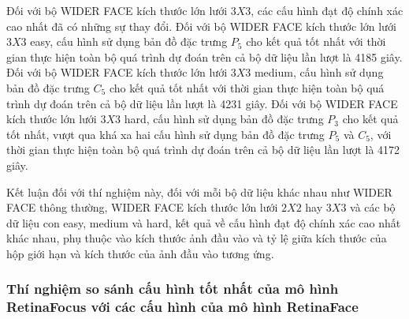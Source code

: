 {    \noindent
    Đối với bộ WIDER FACE kích thước lớn lưới $3 X 3$, các cấu hình đạt độ chính xác cao nhất đã có những sự thay đổi.
    Đối với bộ WIDER FACE kích thước lớn lưới $3 X 3$ easy, cấu hình sử dụng bản đồ đặc trưng ${P}_{5}$ cho kết quả tốt nhất với thời gian thực hiện toàn bộ quá trình dự đoán trên cả bộ dữ liệu lần lượt là 4185 giây.
    Đối với bộ WIDER FACE kích thước lớn lưới $3 X 3$ medium, cấu hình sử dụng bản đồ đặc trưng ${C}_{5}$ cho kết quả tốt nhất với thời gian thực hiện toàn bộ quá trình dự đoán trên cả bộ dữ liệu lần lượt là 4231 giây.
    Đối với bộ WIDER FACE kích thước lớn lưới $3 X 3$ hard, cấu hình sử dụng bản đồ đặc trưng ${P}_{3}$ cho kết quả tốt nhất, vượt qua khá xa hai cấu hình sử dụng bản đồ đặc trưng ${P}_{5}$ và ${C}_{5}$, với thời gian thực hiện toàn bộ quá trình dự đoán trên cả bộ dữ liệu lần lượt là 4172 giây.

    \noindent
    Kết luận đối với thí nghiệm này, đối với mỗi bộ dữ liệu khác nhau như WIDER FACE thông thường, WIDER FACE kích thước lớn lưới $2 X 2$ hay $3 X 3$ và các bộ dữ liệu con easy, medium và hard, kết quả về cấu hình đạt độ chính xác cao nhất khác nhau, phụ thuộc vào kích thước ảnh đầu vào và tỷ lệ giữa kích thước của hộp giới hạn và kích thước của ảnh đầu vào tương ứng.

    \subsubsection*{Thí nghiệm so sánh cấu hình tốt nhất của mô hình RetinaFocus với các cấu hình của mô hình RetinaFace}

}
